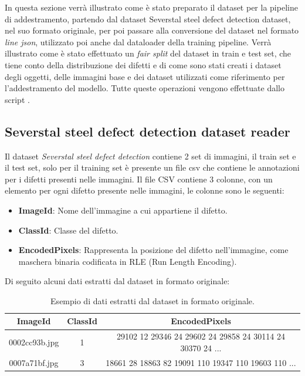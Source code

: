 In questa sezione verrà illustrato come è stato preparato il dataset per la pipeline di addestramento, partendo dal dataset
Severstal steel defect detection dataset, nel suo formato originale, per poi passare alla conversione del dataset nel formato \textit{line json},
utilizzato poi anche dal dataloader della training pipeline.
Verrà illustrato come è stato effettuato un \textit{fair split} del dataset in train e test set, che tiene conto della distribuzione dei difetti
e di come sono stati creati i dataset degli oggetti, delle immagini base e dei dataset utilizzati come riferimento per l'addestramento del modello.
Tutte queste operazioni vengono effettuate dallo script .

\subsection{Severstal steel defect detection dataset reader}
Il dataset \textit{Severstal steel defect detection} contiene 2 set di immagini, il train set e il test set, solo per il
training set è presente un file csv che contiene le annotazioni per i difetti presenti nelle immagini.
Il file CSV contiene 3 colonne, con un elemento per ogni difetto presente nelle immagini, le colonne sono le seguenti:

\begin{itemize}
    \item \textbf{ImageId}: Nome dell'immagine a cui appartiene il difetto.
    \item \textbf{ClassId}: Classe del difetto.
    \item \textbf{EncodedPixels}: Rappresenta la posizione del difetto nell'immagine, come maschera binaria codificata in RLE (Run Length Encoding).
\end{itemize}

Di seguito alcuni dati estratti dal dataset in formato originale:

\begin{table}[H]
    \centering
    \begin{tabular}{|c|c|c|}
        \hline
        ImageId & ClassId & EncodedPixels \\
        \hline
        0002cc93b.jpg & 1 & 29102 12 29346 24 29602 24 29858 24 30114 24 30370 24 ... \\
        \hline
        0007a71bf.jpg & 3 & 18661 28 18863 82 19091 110 19347 110 19603 110 ... \\
        \hline
    \end{tabular}
    \caption{Esempio di dati estratti dal dataset in formato originale.}
    \label{tab:Severstal steel defect detection dataset}
\end{table}

